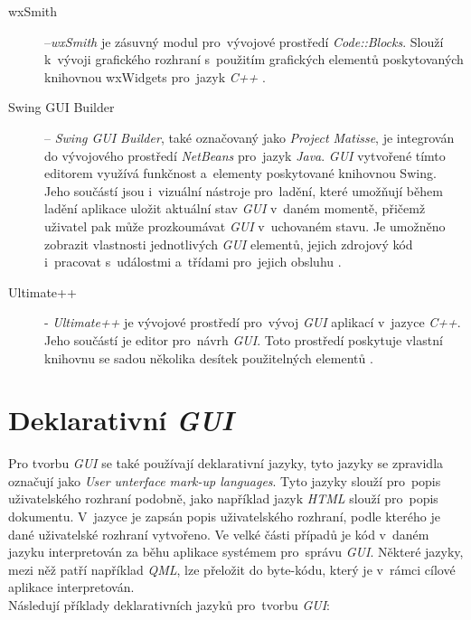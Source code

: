 \documentclass[11pt,twoside,a4paper]{book}
\begin{document}
\begin{description}
\item [wxSmith] –\textit{wxSmith} je zásuvný modul pro~vývojové prostředí \textit{Code::Blocks}. Slouží k~vývoji grafického rozhraní s~použitím grafických elementů poskytovaných knihovnou wxWidgets pro~jazyk \textit{C++} \cite{bib:wxSmith}.
\item [Swing GUI Builder] – \textit{Swing GUI Builder}, také označovaný jako \textit{Project Matisse}, je integrován do vývojového prostředí \textit{NetBeans} pro~jazyk \textit{Java}.  \textit{GUI} vytvořené tímto editorem využívá funkčnost a~elementy poskytované knihovnou Swing. Jeho součástí jsou i~vizuální nástroje pro~ladění, které umožňují během ladění aplikace uložit aktuální stav \textit{GUI} v~daném momentě, přičemž uživatel pak může prozkoumávat \textit{GUI} v~uchovaném stavu. Je umožněno zobrazit vlastnosti jednotlivých \textit{GUI} elementů, jejich zdrojový kód i~pracovat s~událostmi a~třídami pro~jejich obsluhu \cite{bib:swingBuilder}.
\item[Ultimate++] - \textit{Ultimate++} je vývojové prostředí pro~vývoj \textit{GUI} aplikací v~jazyce \textit{C++}. Jeho součástí je editor pro~návrh \textit{GUI}. Toto prostředí poskytuje vlastní knihovnu se sadou několika desítek použitelných elementů \cite{bib:ultimate}.
\end{description}


\section{\label{SEC:declGUI}Deklarativní \textit{GUI}}
Pro tvorbu \textit{GUI} se také používají deklarativní jazyky, tyto jazyky se zpravidla označují jako \textit{User unterface mark-up languages}. Tyto jazyky slouží pro~popis uživatelského rozhraní podobně, jako například jazyk \textit{HTML} slouží pro~popis dokumentu. V~jazyce je zapsán popis uživatelského rozhraní, podle kterého je dané uživatelské rozhraní vytvořeno. Ve velké části případů je kód v~daném jazyku interpretován za běhu aplikace systémem pro~správu \textit{GUI}. Některé jazyky, mezi něž patří například \textit{QML}, lze přeložit do byte-kódu, který je v~rámci cílové aplikace interpretován.\\
Následují příklady deklarativních jazyků pro~tvorbu \textit{GUI}:
\end{document}
